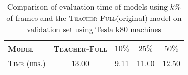\documentclass[10pt,twocolumn,letterpaper]{article}
\newcommand{\Model}{\textsc{TeaStud}\xspace}
\newcommand{\full}{\textsc{Teacher-Full}}
\begin{document}
\vspace*{-4mm}
\begin{table}
\centering
\begin{tabular}{@{}lcccc@{}}
\toprule
\textsc{Model}    & \full & $10\%$ &  $25\% $  & $50\% $     \\
\midrule
\textsc{Time (hrs.)}&  13.00  &  9.11 &  11.00 &   12.50 \\
\bottomrule
\end{tabular}
\vspace*{-3mm}
\caption{Comparison of evaluation time of models using $k\%$ of frames and the \full (original) model  on validation set using Tesla k80 machines}
\label{table2}
\vspace*{-4mm}
\end{table}

\end{document}
